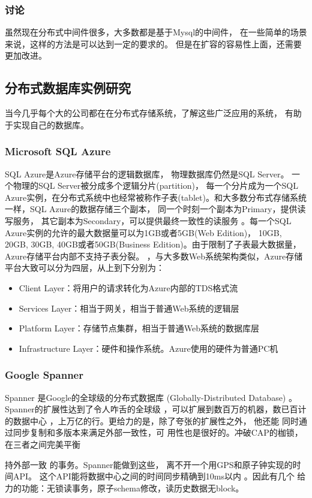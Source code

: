 \subsubsection{讨论}
虽然现在分布式中间件很多，大多数都是基于Mysql的中间件，
在一些简单的场景来说，这样的方法是可以达到一定的要求的。
但是在扩容的容易性上面，还需要更加改进。
\subsection{分布式数据库实例研究}
当今几乎每个大的公司都在在分布式存储系统，了解这些广泛应用的系统，
有助于实现自己的数据库。
\subsubsection{Microsoft SQL Azure}
SQL Azure是Azure存储平台的逻辑数据库，
物理数据库仍然是SQL Server。
一个物理的SQL Server被分成多个逻辑分片(partition)，
每一个分片成为一个SQL Azure实例，在分布式系统中也经常被称作子表(tablet)。和大多数分布式存储系统一样，SQL Azure的数据存储三个副本，
同一个时刻一个副本为Primary，提供读写服务，
其它副本为Secondary，可以提供最终一致性的读服务
。每一个SQL Azure实例的允许的最大数据量可以为1GB或者5GB(Web Edition)，
10GB, 20GB, 30GB, 40GB或者50GB(Business Edition)。由于限制了子表最大数据量，Azure存储平台内部不支持子表分裂。
，与大多数Web系统架构类似，Azure存储平台大致可以分为四层，从上到下分别为：

\begin{itemize}
	\item Client Layer：将用户的请求转化为Azure内部的TDS格式流
	\item Services Layer：相当于网关，相当于普通Web系统的逻辑层
	\item Platform Layer：存储节点集群，相当于普通Web系统的数据库层
	\item Infrastructure Layer：硬件和操作系统。Azure使用的硬件为普通PC机
\end{itemize}
\subsubsection{Google Spanner}
Spanner 是Google的全球级的分布式数据库 (Globally-Distributed Database) 。
Spanner的扩展性达到了令人咋舌的全球级
，可以扩展到数百万的机器，数已百计的数据中心
，上万亿的行。更给力的是，除了夸张的扩展性之外，
他还能 同时通过同步复制和多版本来满足外部一致性，可
用性也是很好的。冲破CAP的枷锁，在三者之间完美平衡

持外部一致 的事务。Spanner能做到这些，
离不开一个用GPS和原子钟实现的时间API。
这个API能将数据中心之间的时间同步精确到10ms以内
。因此有几个 给力的功能：无锁读事务，原子schema修改，读历史数据无block。
